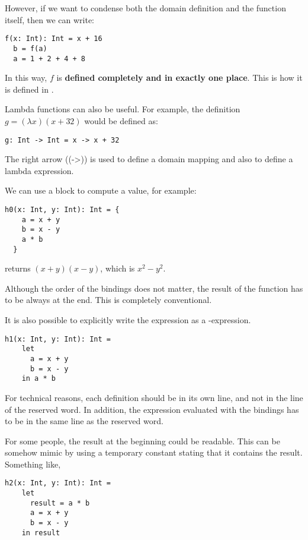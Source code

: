 However, if we want to condense both the domain definition and the function itself, then we can write:
\begin{lstlisting}[label={lst:exampleFunctionDefinition}]
  f(x: Int): Int = x + 16
  b = f(a)
  a = 1 + 2 + 4 + 8
\end{lstlisting}

In this way, $f$ is \textbf{defined completely and in exactly one place}.
This is how it is defined in \Soda.

Lambda functions can also be useful.
For example, the definition
$g = (\lambda x)(x + 32)$
would be defined as:
\begin{lstlisting}[label={lst:exampleFunctionDefinitionWithLambda}]
  g: Int -> Int = x -> x + 32
\end{lstlisting}

The right arrow (\srccode(->)) is used to define a domain mapping and also to define a lambda expression.


We can use a block to compute a value, for example:
\begin{lstlisting}[label={lst:exampleFunctionDefinitionWithBraces}]
  h0(x: Int, y: Int): Int = {
    a = x + y
    b = x - y
    a * b
  }
\end{lstlisting}
returns $(x + y)(x - y)$, which is $x^{2} - y^{2}$.

Although the order of the bindings does not matter, the result of the function has to be always at the end.
This is completely conventional.

It is also possible to explicitly write the expression as a \sodalet-\sodain expression.
\begin{lstlisting}[label={lst:exampleFunctionDefinitionWithLetIn}]
  h1(x: Int, y: Int): Int =
    let
      a = x + y
      b = x - y
    in a * b
\end{lstlisting}

For technical reasons, each definition should be in its own line, and not in the line of the \sodalet reserved word.
In addition, the expression evaluated with the bindings has to be in the same line as the \sodain reserved word.

For some people, the result at the beginning could be readable.
This can be somehow mimic by using a temporary constant stating that it contains the result.
Something like,
\begin{lstlisting}[label={lst:exampleFunctionDefinitionWithBlockAndResult}]
  h2(x: Int, y: Int): Int =
    let
      result = a * b
      a = x + y
      b = x - y
    in result
\end{lstlisting}

